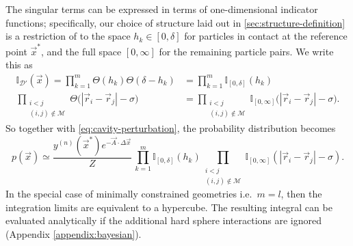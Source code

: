 \documentclass[11pt,twoside]{report}
\begin{document}
The singular terms can be expressed in terms of one-dimensional indicator functions; specifically, our choice of structure laid out in \ref{sec:structure-definition} is a restriction of to the space $h_k \in [0, \delta]$ for particles in contact at the reference point $\vec{x}^*$, and the full space $[0, \infty]$ for the remaining particle pairs.
We write this as
\begin{subequations}
  \begin{align}
    \mathbb{I}_{\mathcal{D}'}(\vec{x})
    =
    \prod_{k = 1}^m
    \Theta ( h_k )
    \Theta ( \delta - h_k )
    &=
    \prod_{k = 1}^m \mathbb{I}_{[0, \delta]}(h_k)
    \\
    \prod_{\substack{i < j \\ (i,j) \notin \mathcal{M}}}
    \Theta \Big( |\vec{r}_i - \vec{r}_j| - \sigma \Big)
    &=
    \prod_{\substack{i < j \\ (i,j) \notin \mathcal{M}}}
    \mathbb{I}_{[0, \infty]}
    \Big( |\vec{r}_i - \vec{r}_j| - \sigma \Big).
  \end{align}
\end{subequations}
So together with \eqref{eq:cavity-perturbation}, the probability distribution becomes
\begin{equation}\label{eq:expanded-structure-p}
  p(\vec{x})
  \simeq
  \frac{y^{(n)}(\vec{x}^*) e^{-\vec{A} \cdot \Delta \vec{x}}}{Z}
  \,
  \prod_{k = 1}^m \mathbb{I}_{[0, \delta]}(h_k)
  \prod_{\substack{i < j \\ (i,j) \notin \mathcal{M}}}
  \mathbb{I}_{[0, \infty]}(|\vec{r}_i - \vec{r}_j| - \sigma).
\end{equation}
In the special case of minimally constrained geometries i.e.\ $m = l$, then the integration limits are equivalent to a hypercube.
The resulting integral can be evaluated analytically if the additional hard sphere interactions are ignored (Appendix \ref{appendix:bayesian}).
\end{document}
